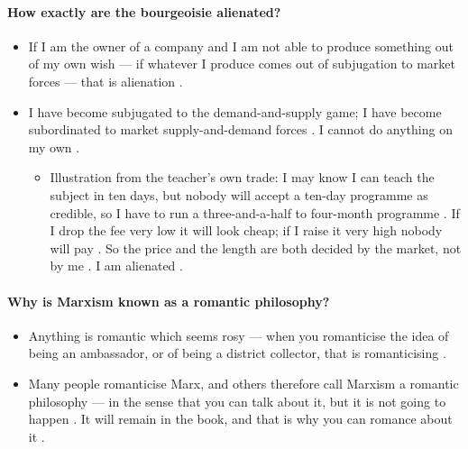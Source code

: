 \paragraph{How exactly are the bourgeoisie alienated?}
\begin{itemize}
    \item If I am the owner of a company and I am not able to produce something out of my own wish --- if whatever I produce comes out of subjugation to market forces --- that is alienation .
    \item I have become subjugated to the demand-and-supply game; I have become subordinated to market supply-and-demand forces . I cannot do anything on my own .
    \begin{itemize}
        \item Illustration from the teacher's own trade: I may know I can teach the subject in ten days, but nobody will accept a ten-day programme as credible, so I have to run a three-and-a-half to four-month programme . If I drop the fee very low it will look cheap; if I raise it very high nobody will pay . So the price and the length are both decided by the market, not by me . I am alienated .
    \end{itemize}
\end{itemize}

\paragraph{Why is Marxism known as a romantic philosophy?}
\begin{itemize}
    \item Anything is romantic which seems rosy --- when you romanticise the idea of being an ambassador, or of being a district collector, that is romanticising .
    \item Many people romanticise Marx, and others therefore call Marxism a romantic philosophy --- in the sense that you can talk about it, but it is not going to happen . It will remain in the book, and that is why you can romance about it .
\end{itemize}

